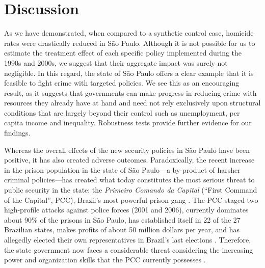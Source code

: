 \documentclass[a4paper,11pt]{article}
\begin{document}
\section{Discussion}

As we have demonstrated, when compared to a synthetic control case, homicide rates were drastically reduced in S\~{a}o Paulo. Although it is not possible for us to estimate the treatment effect of each specific policy implemented during the 1990s and 2000s, we suggest that their aggregate impact was surely not negligible. In this regard, the state of S\~{a}o Paulo offers a clear example that it is feasible to fight crime with targeted policies. We see this as an encouraging result, as it suggests that governments can make progress in reducing crime with resources they already have at hand and need not rely exclusively upon structural conditions that are largely beyond their control such as unemployment, per capita income and inequality. Robustness tests provide further evidence for our findings.

Whereas the overall effects of the new security policies in S\~{a}o Paulo have been positive, it has also created adverse outcomes. Paradoxically, the recent increase in the prison population in the state of S\~{a}o Paulo---a by-product of harsher criminal policies---has created what today constitutes the most serious threat to public security in the state: the \textit{Primeiro Comando da Capital} (``First Command of the Capital'', PCC), Brazil's most powerful prison gang \citep{dias2009, souza2007}. The PCC staged two high-profile attacks against police forces (2001 and 2006), currently dominates about 90\% of the prisons in S\~{a}o Paulo, has established itself in 22 of the 27 Brazilian states, makes profits of about 50 million dollars per year, and has allegedly elected their own representatives in Brazil's last elections \citep{biondi2010}. Therefore, the state government now faces a considerable threat considering the increasing power and organization skills that the PCC currently possesses \citep{freire2014}.
\end{document}
